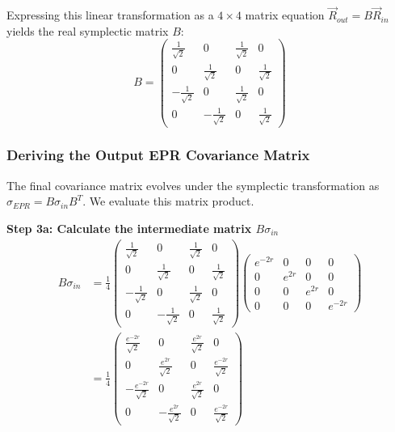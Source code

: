 {Expressing this linear transformation as a $4 \times 4$ matrix equation $\vec{R}_{out} = B\vec{R}_{in}$ yields the real symplectic matrix $B$:
\begin{equation*}
B = \begin{pmatrix} \frac{1}{\sqrt{2}} & 0 & \frac{1}{\sqrt{2}} & 0 \\ 0 & \frac{1}{\sqrt{2}} & 0 & \frac{1}{\sqrt{2}} \\ -\frac{1}{\sqrt{2}} & 0 & \frac{1}{\sqrt{2}} & 0 \\ 0 & -\frac{1}{\sqrt{2}} & 0 & \frac{1}{\sqrt{2}} \end{pmatrix}
\end{equation*}

\subsubsection{Deriving the Output EPR Covariance Matrix }
The final covariance matrix evolves under the symplectic transformation as $\sigma_{EPR} = B \sigma_{in} B^T$. We evaluate this matrix product. 

\textbf{Step 3a: Calculate the intermediate matrix $B \sigma_{in}$}
\begin{align*}
B \sigma_{in} &= \frac{1}{4} \begin{pmatrix} \frac{1}{\sqrt{2}} & 0 & \frac{1}{\sqrt{2}} & 0 \\ 0 & \frac{1}{\sqrt{2}} & 0 & \frac{1}{\sqrt{2}} \\ -\frac{1}{\sqrt{2}} & 0 & \frac{1}{\sqrt{2}} & 0 \\ 0 & -\frac{1}{\sqrt{2}} & 0 & \frac{1}{\sqrt{2}} \end{pmatrix} \begin{pmatrix} e^{-2r} & 0 & 0 & 0 \\ 0 & e^{2r} & 0 & 0 \\ 0 & 0 & e^{2r} & 0 \\ 0 & 0 & 0 & e^{-2r} \end{pmatrix} \\
&= \frac{1}{4} \begin{pmatrix} \frac{e^{-2r}}{\sqrt{2}} & 0 & \frac{e^{2r}}{\sqrt{2}} & 0 \\ 0 & \frac{e^{2r}}{\sqrt{2}} & 0 & \frac{e^{-2r}}{\sqrt{2}} \\ -\frac{e^{-2r}}{\sqrt{2}} & 0 & \frac{e^{2r}}{\sqrt{2}} & 0 \\ 0 & -\frac{e^{2r}}{\sqrt{2}} & 0 & \frac{e^{-2r}}{\sqrt{2}} \end{pmatrix}
\end{align*}

}
